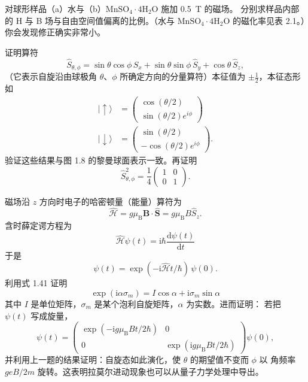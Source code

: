  对球形样品（a）水与（b）$\mathrm{MnSO_4\cdot4H_2O}$ 施加 0.5~T 的磁场。
分别求样品内部的 H 与 B 场与自由空间值偏离的比例。（水与 $\mathrm{MnSO_4\cdot4H_2O}$
的磁化率见表 2.1。）你会发现修正确实非常小。

 证明算符
\begin{equation*}
\hat{S}_{\theta,\phi} = \sin\theta\cos\phi\,\hat{S}_x + \sin\theta\sin\phi\,\hat{S}_y + \cos\theta\,\hat{S}_z,\tag{1.84}
\end{equation*}
（它表示自旋沿由球极角 $\theta$、$\phi$ 所确定方向的分量算符）本征值为
$\pm\frac{1}{2}$，本征态形如
\begin{align*}
|\!\uparrow\rangle &= \begin{pmatrix}\cos(\theta/2)\\ \sin(\theta/2)e^{i\phi}\end{pmatrix}\tag{1.85}\\
|\!\downarrow\rangle &= \begin{pmatrix}\sin(\theta/2)\\ -\cos(\theta/2)e^{i\phi}\end{pmatrix}.\tag{1.86}
\end{align*}
验证这些结果与图 1.8 的黎曼球面表示一致。再证明
\begin{equation*}
\hat{S}_{\theta,\phi}^{2} = \frac{1}{4}\begin{pmatrix}1 & 0\\ 0 & 1\end{pmatrix}.\tag{1.87}
\end{equation*}

 磁场沿 $z$ 方向时电子的哈密顿量（能量）算符为
\begin{equation*}
\hat{\mathcal{H}} = g\mu_{\mathrm{B}}\mathbf{B}\cdot\hat{\mathbf{S}} = g\mu_{\mathrm{B}}B\hat{S}_z.\tag{1.88}
\end{equation*}
含时薛定谔方程为
\begin{equation*}
\hat{\mathcal{H}}\psi(t) = \mathrm{i}\hbar\frac{\mathrm{d}\psi(t)}{\mathrm{d}t}\tag{1.89}
\end{equation*}
于是
\begin{equation*}
\psi(t) = \exp(-\mathrm{i}\hat{\mathcal{H}}t/\hbar)\,\psi(0).\tag{1.90}
\end{equation*}
利用式 1.41 证明
\begin{equation*}
\exp(\mathrm{i}\alpha\sigma_m) = I\cos\alpha + \mathrm{i}\sigma_m\sin\alpha\tag{1.91}
\end{equation*}
其中 $I$ 是单位矩阵，$\sigma_m$ 是某个泡利自旋矩阵，$\alpha$ 为实数。进而证明：
若把 $\psi(t)$ 写成旋量，
\begin{equation*}
\psi(t) = \begin{pmatrix} \exp(-\mathrm{i}g\mu_{\mathrm{B}}Bt/2\hbar) & 0\\ 0 & \exp(\mathrm{i}g\mu_{\mathrm{B}}Bt/2\hbar) \end{pmatrix}\psi(0),\tag{1.92}
\end{equation*}
并利用上一题的结果证明：自旋态如此演化，使 $\theta$ 的期望值不变而 $\phi$ 以
角频率 $geB/2m$ 旋转。这表明拉莫尔进动现象也可以从量子力学处理中导出。


